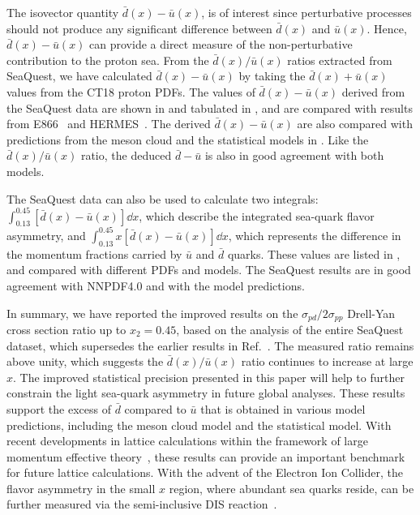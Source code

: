 \documentclass[reprint,aps,unsortedaddress,superscriptaddress,prl,floatfix,showpacs,linenumbers]{revtex4-2}
\begin{document}
The isovector quantity $\bar{d}(x) - \bar{u}(x)$,
is of interest since perturbative processes should not produce any significant difference between $\bar{d}(x)$ and $\bar{u}(x)$.
Hence, $\bar{d}(x) - \bar{u}(x)$ can provide a direct measure of the non-perturbative contribution to the proton sea.
From the $\bar{d}(x) / \bar{u}(x)$ ratios extracted from SeaQuest,
we have calculated $\bar{d}(x) - \bar u(x)$ by taking the $\bar{d}(x) + \bar{u}(x)$ values from the CT18 proton PDFs.
The values of $\bar{d}(x)-\bar{u}(x)$ derived from the SeaQuest data are
shown in  and tabulated in ,
and are compared with results from E866~\cite{towell2001} and
HERMES~\cite{ackerstaff1998}.
The derived $\bar{d}(x)-\bar{u}(x)$ are also compared with predictions from the meson cloud and the statistical models in .
Like the $\bar{d}(x) / \bar{u}(x)$ ratio, the deduced $\bar{d}-\bar{u}$ is also in good agreement with both models.

The SeaQuest data can also be used to calculate two integrals:
$\int^{0.45}_{0.13} \left[\bar{d}\left(x\right) - \bar{u}\left(x\right) \right]\dd{x}$,
which describe the integrated sea-quark flavor asymmetry, and
$\int^{0.45}_{0.13} x\left[\bar{d}\left(x\right) - \bar{u}\left(x\right) \right]\dd{x}$,
which represents the difference in the momentum fractions carried
by $\bar{u}$ and $\bar{d}$ quarks.
These values are listed in , and compared with different PDFs and models.
The SeaQuest results are in good agreement with NNPDF4.0 and with the model predictions.

In summary, we have reported the improved results on the
$\sigma_{pd}/2\sigma_{pp}$ Drell-Yan cross section ratio up to $x_2=0.45$,
based on the analysis of the entire SeaQuest dataset,
which supersedes the earlier results in Ref.~\cite{dove2021,dove2023}.
The measured ratio remains above unity,
which suggests the $\bar{d}(x)/\bar{u}(x)$ ratio continues to increase at large $x$.
The improved statistical precision presented in this paper will help to
further constrain the light sea-quark asymmetry in future global analyses.
These results support the excess of $\bar{d}$ compared to $\bar{u}$ that is obtained in various model predictions,
including the meson cloud model and the statistical model.
With recent developments in lattice calculations within the framework
of large momentum effective theory~\cite{constantinou2021},
these results can provide an important benchmark for future lattice
calculations.
With the advent of the Electron Ion Collider, the flavor asymmetry in the small $x$ region,
where abundant sea quarks reside, can be further measured via the semi-inclusive DIS reaction~\cite{ackerstaff1998}.
\end{document}
